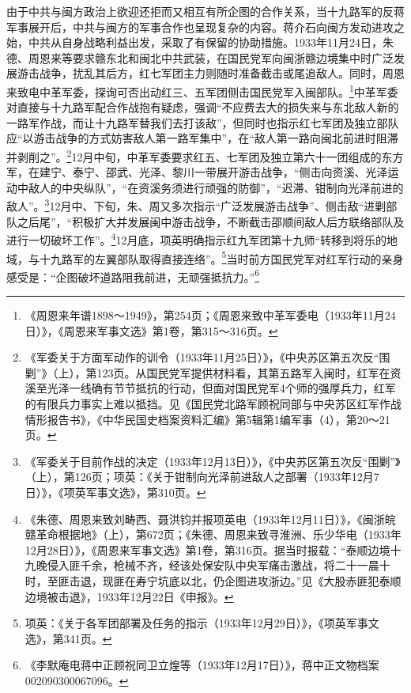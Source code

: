 由于中共与闽方政治上欲迎还拒而又相互有所企图的合作关系，当十九路军的反蒋军事展开后，中共与闽方的军事合作也呈现复杂的内容。蒋介石向闽方发动进攻之始，中共从自身战略利益出发，采取了有保留的协助措施。1933年11月24日，朱德、周恩来等要求赣东北和闽北中共武装，在国民党军向闽浙赣边境集中时广泛发展游击战争，扰乱其后方，红七军团主力则随时准备截击或尾追敌人。同时，周恩来致电中革军委，探询可否出动红三、五军团侧击国民党军入闽部队。\footnote{《周恩来年谱1898～1949》，第254页；《周恩来致中革军委电（1933年11月24日）》，《周恩来军事文选》第1卷，第315～316页。}中革军委对直接与十九路军配合作战抱有疑虑，强调“不应费去大的损失来与东北敌人新的一路军作战，而让十九路军替我们去打该敌”，但同时也指示红七军团及独立部队应“以游击战争的方式妨害敌人第一路军集中”，在“敌人第一路向闽北前进时阻滞并剥削之”。\footnote{《军委关于方面军动作的训令（1933年11月25日）》，《中央苏区第五次反“围剿”》（上），第123页。从国民党军提供材料看，其第五路军入闽时，红军在资溪至光泽一线确有节节抵抗的行动，但面对国民党军4个师的强厚兵力，红军的有限兵力事实上难以抵挡。见《国民党北路军顾祝同部与中央苏区红军作战情形报告书》，《中华民国史档案资料汇编》第5辑第1编军事（4），第20～21页。}12月中旬，中革军委要求红五、七军团及独立第六十一团组成的东方军，在建宁、泰宁、邵武、光泽、黎川一带展开游击战争，“侧击向资溪、光泽运动中敌人的中央纵队”，“在资溪务须进行顽强的防御”，“迟滞、钳制向光泽前进的敌人”。\footnote{《军委关于目前作战的决定（1933年12月13日）》，《中央苏区第五次反“围剿”》（上），第126页；项英：《关于钳制向光泽前进敌人之部署（1933年12月7日）》，《项英军事文选》，第310页。}12月中、下旬，朱、周又多次指示“广泛发展游击战争”、侧击敌“进剿部队之后尾”，“积极扩大并发展闽中游击战争，不断截击邵顺间敌人后方联络部队及进行一切破坏工作”。\footnote{《朱德、周恩来致刘畴西、聂洪钧并报项英电（1933年12月11日）》，《闽浙皖赣革命根据地》（上），第672页；《朱德、周恩来致寻淮洲、乐少华电（1933年12月28日）》，《周恩来军事文选》第1卷，第316页。据当时报载：“泰顺边境十九晚侵入匪千余，枪械不齐，经该处保安队中央军痛击激战，将二十一晨十时，至匪击退，现匪在寿宁坑底以北，仍企图进攻浙边。”见《大股赤匪犯泰顺边境被击退》，1933年12月22日《申报》。}12月底，项英明确指示红九军团第十九师“转移到将乐的地域，与十九路军的左翼部队取得直接连络”。\footnote{项英：《关于各军团部署及任务的指示（1933年12月29日）》，《项英军事文选》，第341页。}当时前方国民党军对红军行动的亲身感受是：“企图破坏道路阻我前进，无顽强抵抗力。”\footnote{《李默庵电蒋中正顾祝同卫立煌等（1933年12月17日）》，蒋中正文物档案002090300067096。}


